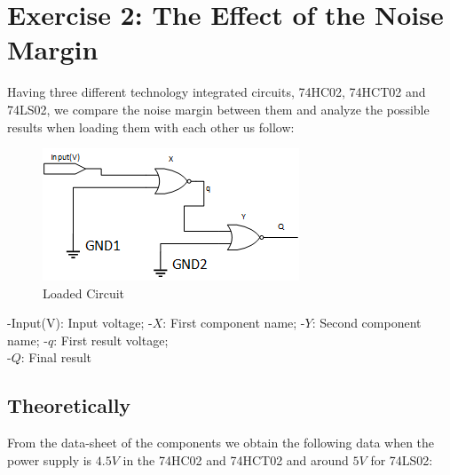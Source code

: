 



%
%
%

\section{\color{olive}Exercise 2: The Effect of the Noise Margin}

Having three different technology integrated circuits, 74HC02, 74HCT02 and 74LS02, we compare the noise margin between them and analyze the possible results when loading them with each other us follow:

\begin{figure}[h!]
        \centering
        \includegraphics[scale=1]{circuit2.png}
        \caption{\color{cyan}Loaded Circuit}
        \label{fig:ej2cir}
\end{figure}

-Input(V): Input voltage; 
-$X$: First component name; 
-$Y$: Second component name; 
-$q$: First result voltage; \\
-$Q$: Final result

	\subsection{\color{purple}Theoretically}
	
	 From the data-sheet of the components we obtain the following data when the power supply is $4.5V$ in the 74HC02 and 74HCT02 and around $5V$ for 74LS02:
	 
